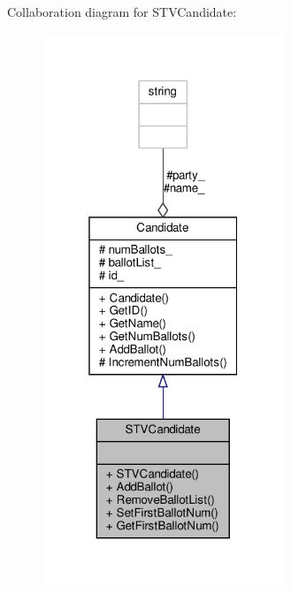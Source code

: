 Collaboration diagram for S\+T\+V\+Candidate\+:
\nopagebreak
\begin{figure}[H]
\begin{center}
\leavevmode
\includegraphics[width=205pt]{classSTVCandidate__coll__graph}
\end{center}
\end{figure}
